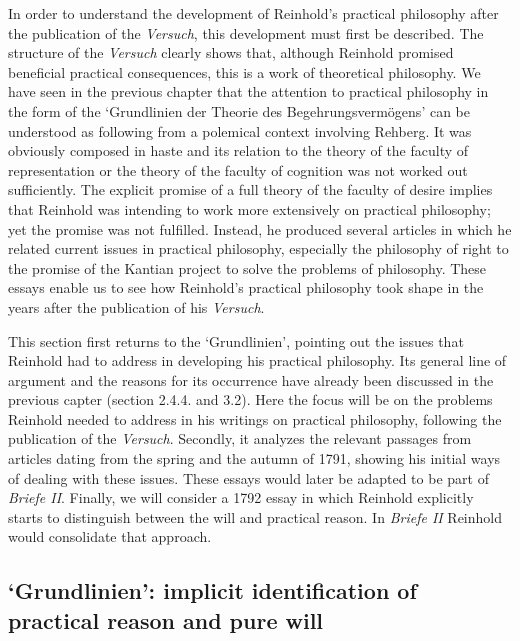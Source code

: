 In order to understand the development of Reinhold's practical philosophy after the publication of the \textit{Versuch}, this development must first be described. The structure of the \textit{Versuch} clearly shows that, although Reinhold promised beneficial practical consequences, this is a work of theoretical philosophy. We have seen in the previous chapter that the attention to practical philosophy in the form of the `Grundlinien der Theorie des Begehrungsverm\"{o}gens' can be understood as following from a polemical context involving Rehberg. It was obviously composed in haste and its relation to the theory of the faculty of representation or the theory of the faculty of cognition was not worked out sufficiently. The explicit promise of a full theory of the faculty of desire implies that Reinhold was intending to work more extensively on practical philosophy; yet the promise was not fulfilled. Instead, he produced several articles in which he related current issues in practical philosophy, especially the philosophy of right to the promise of the Kantian project to solve the problems of philosophy. These essays enable us to see how Reinhold's practical philosophy took shape in the years after the publication of his \textit{Versuch}. 

 This section first returns to the `Grundlinien', pointing out the issues that Reinhold had to address in developing his practical philosophy. Its general line of argument and the reasons for its occurrence have already been discussed in the previous capter (section 2.4.4. and 3.2). Here the focus will be on the problems Reinhold needed to address in his writings on practical philosophy, following the publication of the \textit{Versuch}. Secondly, it analyzes the relevant passages from articles dating from the spring and the autumn of 1791, showing his initial ways of dealing with these issues. These essays would later be adapted to be part of \textit{Briefe II}. Finally, we will consider a 1792 essay in which Reinhold explicitly starts to distinguish between the will and practical reason. In \textit{Briefe II} Reinhold would consolidate that approach. 


\subsection{`Grundlinien': implicit identification of practical reason and pure will}


